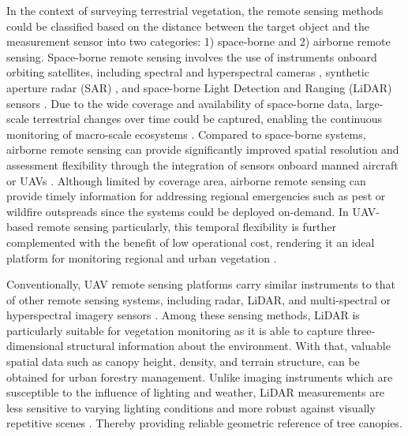 \documentclass[12pt, a4paper]{article}
\begin{document}
In the context of surveying terrestrial vegetation, the remote sensing methods
could be classified based on the distance between the target object and the
measurement sensor into two categories: 1) space-borne and 2) airborne remote
sensing. Space-borne remote sensing involves the use of instruments onboard
orbiting satellites, including spectral and hyperspectral cameras
\cite{Qian2022}, synthetic aperture radar (SAR) \cite{Hu2025}, and space-borne
Light Detection and Ranging (LiDAR) sensors \cite{Bergen2009}. Due to the wide
coverage and availability of space-borne data, large-scale terrestrial changes
over time could be captured, enabling the continuous monitoring of macro-scale
ecosystems \cite{Khan2024}. Compared to space-borne systems, airborne remote
sensing can provide significantly improved spatial resolution and assessment
flexibility through the integration of sensors onboard manned aircraft or UAVs
\cite{Khan2024}. Although limited by coverage area, airborne remote sensing can
provide timely information for addressing regional emergencies such as pest
\cite{Wulder2006} or wildfire \cite{Arroyo2008} outspreads since the systems
could be deployed on-demand. In UAV-based remote sensing particularly, this
temporal flexibility is further complemented with the benefit of low operational
cost, rendering it an ideal platform for monitoring regional and urban
vegetation \cite{Tang2015}. 

Conventionally, UAV remote sensing platforms carry similar instruments to that of other remote sensing systems, including radar, LiDAR, and multi-spectral or hyperspectral imagery sensors \cite{Tang2015}. Among these sensing methods, LiDAR is particularly suitable for vegetation monitoring as it is able to capture three-dimensional structural information about the environment. With that, valuable spatial data such as canopy height, density, and terrain structure, can be obtained for urban forestry management. Unlike imaging instruments which are susceptible to the influence of lighting and weather, LiDAR measurements are less sensitive to varying lighting conditions and more robust against visually repetitive scenes \cite{Wu2024, jiang2025gps}. Thereby providing reliable geometric reference of tree canopies. 
\end{document}
